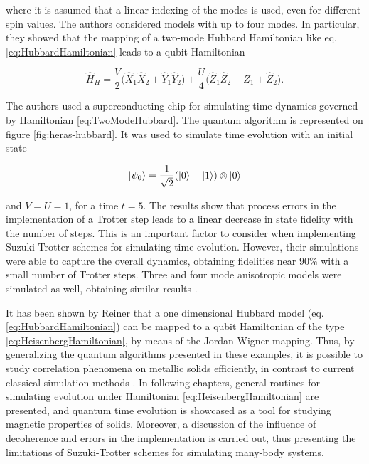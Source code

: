     \noindent where it is assumed that a linear indexing of the modes is used, even for different spin values. The authors considered models with up to four modes. In particular, they showed that the mapping of a two-mode Hubbard Hamiltonian like eq. \ref{eq:HubbardHamiltonian} leads to a qubit Hamiltonian

    \begin{equation}
      \hat{H}_H = \frac{V}{2}\big(\hat{X}_1 \hat{X}_2 + \hat{Y}_1 \hat{Y}_2\big) + \frac{U}{4} \big(\hat{Z}_1 \hat{Z}_2 + \hat{Z}_1 + \hat{Z}_2\big).
      \label{eq:TwoModeHubbard}
    \end{equation}

    \noindent The authors used a superconducting chip for simulating time dynamics governed by Hamiltonian \ref{eq:TwoModeHubbard}. The quantum algorithm is represented on figure \ref{fig:heras-hubbard}. It was used to simulate time evolution with an initial state
    
    $$
    \ket{\psi_0} = \frac{1}{\sqrt{2}}(\ket{0} + \ket{1}) \otimes \ket{0}
    $$

    \noindent and $V=U=1$, for a time $t=5$. The results show that process errors in the implementation of a Trotter step leads to a linear decrease in state fidelity with the number of steps. This is an important factor to consider when implementing Suzuki-Trotter schemes for simulating time evolution. However, their simulations were able to capture the overall dynamics, obtaining fidelities near $90\%$ with a small number of Trotter steps. Three and four mode anisotropic models were simulated as well, obtaining similar results \cite{HubbardSimulLasHeras}.

    It has been shown by Reiner \cite{Mastersthesis} that a one dimensional Hubbard model (eq. \ref{eq:HubbardHamiltonian}) can be mapped to a qubit Hamiltonian of the type \ref{eq:HeisenbergHamiltonian}, by means of the Jordan Wigner mapping. Thus, by generalizing the quantum algorithms presented in these examples, it is possible to study correlation phenomena on metallic solids efficiently, in contrast to current classical simulation methods \cite{Mastersthesis,HubbardOriginal}. In following chapters,  general routines for simulating evolution under Hamiltonian \ref{eq:HeisenbergHamiltonian} are presented, and quantum time evolution is showcased as a tool for studying magnetic properties of solids. Moreover, a discussion of the influence of decoherence and errors in the implementation is carried out, thus presenting the limitations of Suzuki-Trotter schemes for simulating many-body systems.

